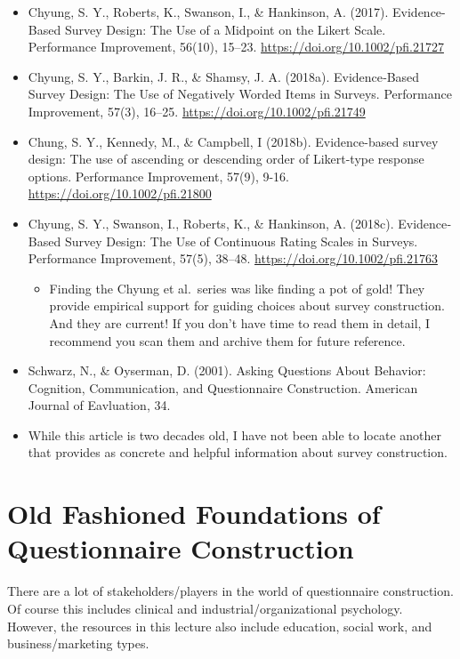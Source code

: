 \documentclass[
  english,
]{book}
\providecommand{\tightlist}{%
  \setlength{\itemsep}{0pt}\setlength{\parskip}{0pt}}
\begin{document}
\begin{itemize}
\tightlist
\item
  Chyung, S. Y., Roberts, K., Swanson, I., \& Hankinson, A. (2017). Evidence-Based Survey Design: The Use of a Midpoint on the Likert Scale. Performance Improvement, 56(10), 15--23. \url{https://doi.org/10.1002/pfi.21727}
\item
  Chyung, S. Y., Barkin, J. R., \& Shamsy, J. A. (2018a). Evidence‐Based Survey Design: The Use of Negatively Worded Items in Surveys. Performance Improvement, 57(3), 16--25. \url{https://doi.org/10.1002/pfi.21749}
\item
  Chung, S. Y., Kennedy, M., \& Campbell, I (2018b). Evidence-based survey design: The use of ascending or descending order of Likert-type response options. Performance Improvement, 57(9), 9-16. \url{https://doi.org/10.1002/pfi.21800}
\item
  Chyung, S. Y., Swanson, I., Roberts, K., \& Hankinson, A. (2018c). Evidence‐Based Survey Design: The Use of Continuous Rating Scales in Surveys. Performance Improvement, 57(5), 38--48. \url{https://doi.org/10.1002/pfi.21763}

  \begin{itemize}
  \tightlist
  \item
    Finding the Chyung et al.~series was like finding a pot of gold! They provide empirical support for guiding choices about survey construction. And they are current! If you don't have time to read them in detail, I recommend you scan them and archive them for future reference.
  \end{itemize}
\item
  Schwarz, N., \& Oyserman, D. (2001). Asking Questions About Behavior: Cognition, Communication, and Questionnaire Construction. American Journal of Eavluation, 34.
\item
  While this article is two decades old, I have not been able to locate another that provides as concrete and helpful information about survey construction.
\end{itemize}

\hypertarget{old-fashioned-foundations-of-questionnaire-construction}{%
\section{Old Fashioned Foundations of Questionnaire Construction}\label{old-fashioned-foundations-of-questionnaire-construction}}

There are a lot of stakeholders/players in the world of questionnaire construction. Of course this includes clinical and industrial/organizational psychology. However, the resources in this lecture also include education, social work, and business/marketing types.
\end{document}
